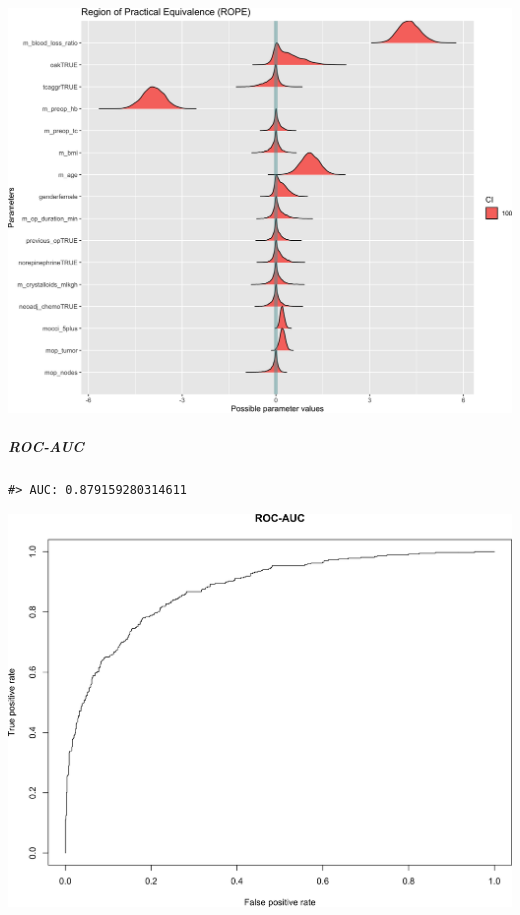 \documentclass[
]{article}
\begin{document}
\begin{center}\includegraphics[width=1\linewidth]{notebook_files/figure-latex/model1full_rope-1} \end{center}

\hypertarget{roc-auc}{%
\subparagraph{ROC-AUC}\label{roc-auc}}

\begin{verbatim}
#> AUC: 0.879159280314611
\end{verbatim}

\begin{center}\includegraphics[width=1\linewidth]{notebook_files/figure-latex/model1full_rocauc-1} \end{center}
\end{document}
